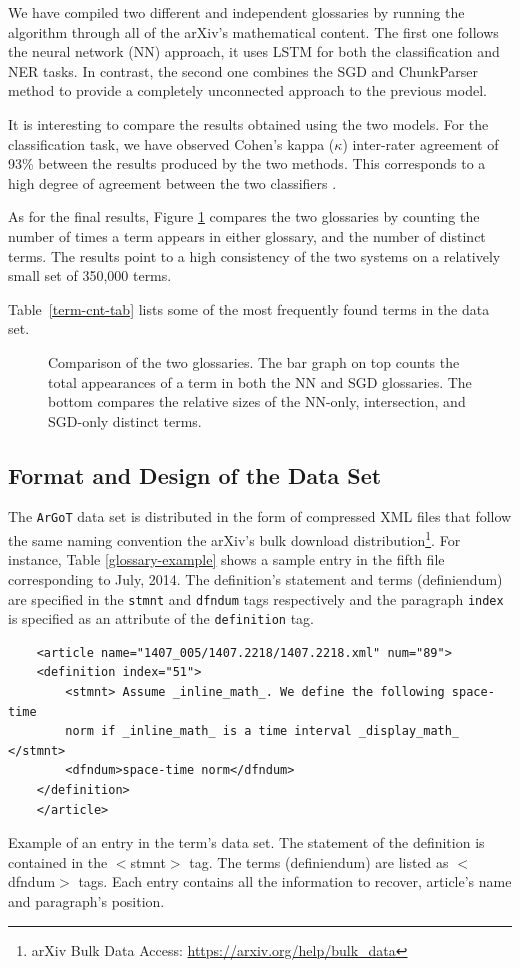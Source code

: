 \documentclass[submission,copyright,creativecommons]{eptcs}
\newcommand{\argot}{\texttt{ArGoT}\xspace}
\begin{document}
We have compiled two different and independent glossaries by running the 
algorithm through all of the arXiv's mathematical content. 
The first one follows the neural network (NN) approach, it uses  LSTM for both the classification and NER tasks. 
In contrast, the second one combines the SGD and ChunkParser method to provide a completely unconnected approach to the previous model.

It is interesting to compare the results obtained using the two models. For the classification task, we have observed Cohen's kappa ($\kappa$) inter-rater agreement of 93\% between the results produced by the two methods.
This corresponds to a high degree of agreement between the two classifiers \cite{cohenkappa}.

As for the final results, Figure \ref{sizes} compares the two glossaries by counting the number of times a term appears in either glossary, and the number of distinct terms.
The results point to a high consistency of the two systems on a relatively small set of 350,000 terms.

Table~\ref{term-cnt-tab} lists some of the most frequently found terms in the
data set. 
\begin{figure}
    \centering
    
    \caption{\label{sizes} Comparison of the two glossaries. The bar graph on top counts the total appearances of a term in both the NN and SGD glossaries. The bottom compares the relative sizes of the NN-only, intersection, and SGD-only distinct terms.}
\end{figure}

\subsection{Format and Design of the Data Set}
The \argot data set is distributed in the form of compressed
XML
files that follow the same naming convention the arXiv's bulk download
distribution\footnote{arXiv Bulk Data Access: \url{https://arxiv.org/help/bulk\_data}}.
For instance, Table \ref{glossary-example} shows a sample entry
in the fifth file corresponding to July, 2014. The definition's
statement and terms (definiendum) are specified in the \texttt{stmnt} and
\texttt{dfndum} tags respectively and the paragraph \texttt{index} is
specified as an attribute of the \texttt{definition} tag.

\begin{table}[h]
    \centering
    \begin{verbatim}
    <article name="1407_005/1407.2218/1407.2218.xml" num="89">
    <definition index="51">
        <stmnt> Assume _inline_math_. We define the following space-time 
        norm if _inline_math_ is a time interval _display_math_ </stmnt>
        <dfndum>space-time norm</dfndum>
    </definition>
    </article>
\end{verbatim}
\caption{\label{glossary-example} Example of an entry in the term's data set. The statement of the definition is contained in the $<$stmnt$>$ tag. The terms (definiendum) are listed as $<$dfndum$>$ tags. Each entry contains all the information to recover, article's name and paragraph's position.}
\end{table}
\end{document}

